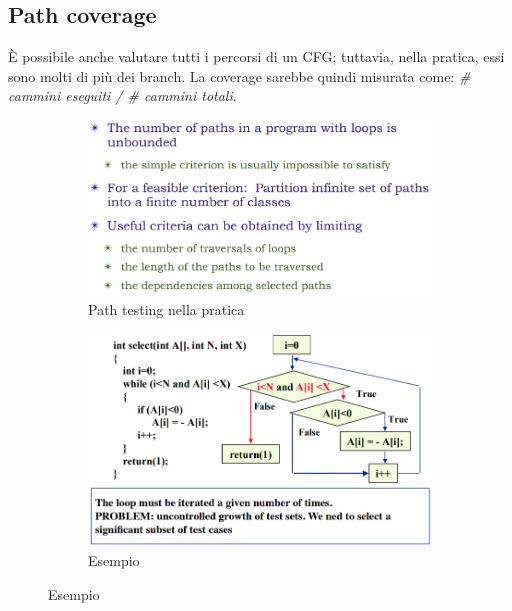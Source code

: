 \documentclass[a4paper,oneside,titlepage]{book}
\begin{document}
\subsection{Path coverage}
\`{E} possibile anche valutare tutti i percorsi di un CFG; tuttavia, nella pratica, essi sono molti di più dei branch. La coverage sarebbe quindi misurata come: \textit{\# cammini eseguiti / \# cammini totali}.
\begin{figure}[htp]
	\begin{subfigure}{0.49\textwidth}
	    \centering
		\includegraphics[width=\textwidth, height=\textheight, keepaspectratio]{path1.png}
		\caption{Path testing nella pratica}
	\end{subfigure}
	\hfill
	\begin{subfigure}{0.49\textwidth}
	    \centering
		\includegraphics[width=\textwidth, height=\textheight, keepaspectratio]{path2.png}
		\caption{Esempio}
	\end{subfigure}
\end{figure}
\end{document}
